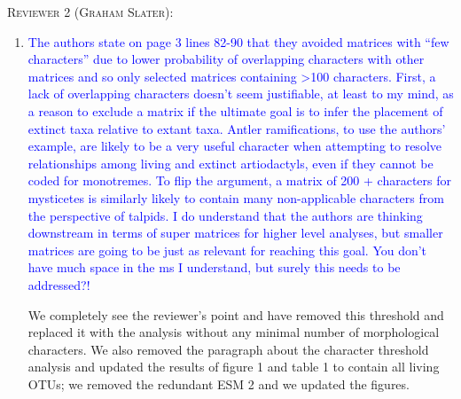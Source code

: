 \documentclass[12pt,letterpaper]{article}
\renewcommand{\section}[1]{%
\bigskip
\begin{center}
\begin{Large}
\normalfont\scshape #1
\medskip
\end{Large}
\end{center}}
\begin{document}
\section{Reviewer 2 (Graham Slater):}
\begin{enumerate}
\item{\textcolor{blue}{The authors state on page 3 lines 82-90 that they avoided matrices with ``few characters'' due to lower probability of overlapping characters with other matrices and so only selected matrices containing >100 characters. First, a lack of overlapping characters doesn’t seem justifiable, at least to my mind, as a reason to exclude a matrix if the ultimate goal is to infer the placement of extinct taxa relative to extant taxa. Antler ramifications, to use the authors' example, are likely to be a very useful character when attempting to resolve relationships among living and extinct artiodactyls, even if they cannot be coded for monotremes. To flip the argument, a matrix of 200 + characters for mysticetes is similarly likely to contain many non-applicable characters from the perspective of talpids. I do understand that the authors are thinking downstream in terms of super matrices for higher level analyses, but smaller matrices are going to be just as relevant for reaching this goal. You don't have much space in the ms I understand, but surely this needs to be addressed?!}}

We completely see the reviewer's point and have removed this threshold and replaced it with the analysis without any minimal number of morphological characters.
We also removed the paragraph about the character threshold analysis and updated the results of figure 1 and table 1 to contain all living OTUs; we removed the redundant ESM 2 and we updated the figures. 


\end{enumerate}
\end{document}
